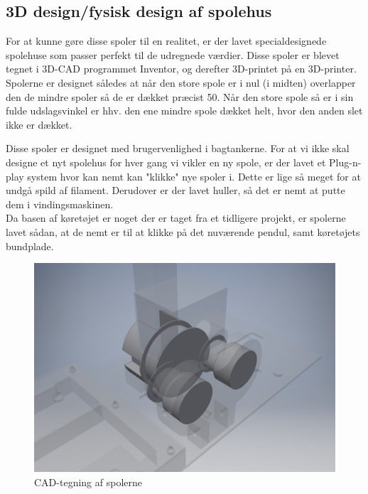 


 






\subsection{3D design/fysisk design af spolehus}
For at kunne gøre disse spoler til en realitet, er der lavet specialdesignede spolehuse som passer perfekt til de udregnede værdier. Disse spoler er blevet tegnet i 3D-CAD programmet Inventor, og derefter 3D-printet på en 3D-printer. \\

Spolerne er designet således at når den store spole er i nul (i midten) overlapper den de mindre spoler så de er dækket præcist 50\percent. Når den store spole så er i sin fulde udslagsvinkel er hhv. den ene mindre spole dækket helt, hvor den anden slet ikke er dækket. \\


Disse spoler er designet med brugervenlighed i bagtankerne. For at vi ikke skal designe et nyt spolehus for hver gang vi vikler en ny spole, er der lavet et Plug-n-play system hvor kan nemt kan "klikke" nye spoler i. Dette er lige så meget for at undgå spild af filament. Derudover er der lavet huller, så det er nemt at putte dem i vindingsmaskinen. \\

Da basen af køretøjet er noget der er taget fra et tidligere projekt, er spolerne lavet sådan, at de nemt er til at klikke på det nuværende pendul, samt køretøjets bundplade. \\

\begin{figure}[h!]
	\centering
	\includegraphics[width=.8\textwidth]{billeder/spoler_3d.png}
	\caption{CAD-tegning af spolerne}
	\label{fig:spole_3d_fig}
\end{figure}

